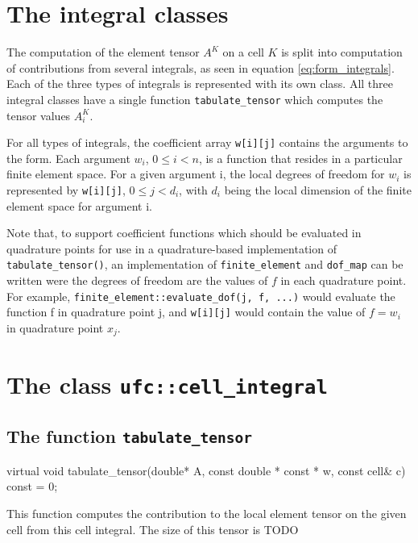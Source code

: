 \section{The integral classes}

The computation of the element tensor $A^K$ on a cell $K$ is split into computation of
contributions from several integrals, as seen in equation \eqref{eq:form_integrals}.
Each of the three types of integrals is represented with its own class.
All three integral classes have a single function \texttt{tabulate\_tensor} which
computes the tensor values $A_i^K$.

For all types of integrals, the coefficient array \texttt{w[i][j]} contains the
arguments to the form. Each argument $w_i$, $0\le i<n$, is a function that resides in a 
particular finite element space. For a given argument i, the local degrees of freedom for $w_i$
is represented by \texttt{w[i][j]}, $0 \le j < d_i$, with $d_i$ being the local dimension of
the finite element space for argument i.

Note that, to support coefficient functions which should be evaluated in quadrature points
for use in a quadrature-based implementation of \texttt{tabulate\_tensor()},
an implementation of \texttt{finite\_element} and \texttt{dof\_map}
can be written were the degrees of freedom are the values of $f$ in each
quadrature point. For example, \texttt{finite\_element::evaluate\_dof(j, f, ...)}
would evaluate the function f in quadrature point j, and \texttt{w[i][j]} would contain
the value of $f=w_i$ in quadrature point $x_j$.

\section{The class \texttt{ufc::cell\_integral}}

\subsection{The function \texttt{tabulate\_tensor}}

\begin{code}
virtual void tabulate_tensor(double* A,
                             const double * const * w,
                             const cell& c) const = 0;
\end{code}

This function computes the contribution to the local element tensor
on the given cell from this cell integral.
The size of this tensor is TODO

